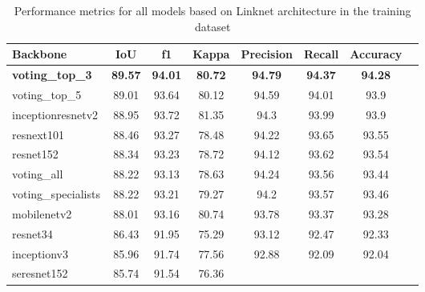 \begin{table}[H]
    \centering
    \caption{Performance metrics for all models based on Linknet
        architecture in the training dataset}
    \label{tab:metrics-train}
    \begin{tabular}{lccccccc}
        \toprule
        Backbone                & IoU            & f1             & Kappa
                                & Precision      & Recall         &
        Accuracy
        \\
        \midrule
        \textbf{voting\_top\_3} & \textbf{89.57} & \textbf{94.01} &
        \textbf{80.72}          & \textbf{94.79} & \textbf{94.37} &
        \textbf{94.28}                                                    \\
        voting\_top\_5          & 89.01          & 93.64          & 80.12
                                & 94.59          & 94.01          & 93.9
        \\
        inceptionresnetv2       & 88.95          & 93.72          & 81.35
                                & 94.3           & 93.99          & 93.9
        \\
        resnext101              & 88.46          & 93.27          & 78.48
                                & 94.22          & 93.65          & 93.55
        \\
        resnet152               & 88.34          & 93.23          & 78.72
                                & 94.12          & 93.62          & 93.54
        \\
        voting\_all             & 88.22          & 93.13          & 78.63
                                & 94.24          & 93.56          & 93.44
        \\
        voting\_specialists     & 88.22          & 93.21          & 79.27
                                & 94.2           & 93.57          &
        93.46
        \\
        mobilenetv2             & 88.01          & 93.16          & 80.74
                                & 93.78          & 93.37          & 93.28
        \\
        resnet34                & 86.43          & 91.95          & 75.29
                                & 93.12          & 92.47          & 92.33
        \\
        inceptionv3             & 85.96          & 91.74          & 77.56
                                & 92.88          & 92.09          & 92.04
        \\
        seresnet152             & 85.74          & 91.54          & 76.36

\end{tabular}
\end{table}
